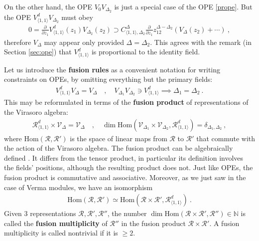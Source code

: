 \documentclass[12pt, a4paper]{article}
\newcommand{\myindex}[1]{\textbf{\boldmath #1}}
\theoremstyle{break}
\begin{document}
On the other hand, the OPE $V_0V_{\Delta_2}$ is just a special case of the OPE \eqref{prope}.
But the OPE $V^d_{\langle 1,1\rangle}V_{\Delta_2}$ must obey 
\begin{align}
 0 = \frac{\partial}{\partial z_1} V^d_{\langle 1,1\rangle}(z_1)V_{\Delta_2}(z_2) \supset C_{\langle 1,1\rangle,\Delta_2}^{\Delta} \frac{\partial}{\partial z_1} z_{12}^{\Delta-\Delta_2} \left(V_\Delta(z_2) +\cdots \right) \ ,
\end{align}
therefore $V_\Delta$ may appear only provided $\Delta=\Delta_2$. This agrees with the remark (in Section \ref{sec:ope}) that $V^d_{\langle 1,1\rangle}$ is proportional to the identity field. 

Let us introduce the \myindex{fusion rules} as a convenient notation for writing constraints on OPEs, by omitting everything but the primary fields:
\begin{align}
 V^d_{\langle 1,1\rangle} V_{\Delta} = V_\Delta \quad , \quad V_{\Delta_1} V_{\Delta_2} \ni V^d_{\langle 1,1\rangle} \implies \Delta_1=\Delta_2\ . 
\end{align}
This may be reformulated in terms of 
the \myindex{fusion product} of representations of the Virasoro algebra:
\begin{align}
 \mathcal{R}^d_{\langle 1,1\rangle} \times \mathcal{V}_\Delta = \mathcal{V}_\Delta \quad , \quad \dim\text{Hom}\left(\mathcal{V}_{\Delta_1}\times \mathcal{V}_{\Delta_2}, \mathcal{R}^d_{\langle 1,1\rangle}\right) = \delta_{\Delta_1,\Delta_2}\ ,
 \label{rtv}
\end{align}
where $\text{Hom}(\mathcal{R},\mathcal{R}')$ is the space of linear maps from $\mathcal{R}$ to $\mathcal{R}'$ that commute with the action of the Virasoro algebra. 
The fusion product can be algebraically defined \cite{gab99}. It differs from the tensor product, in particular its definition involves the fields' positions, although the resulting product does not. Just like OPEs, the fusion product is commutative and associative. Moreover, as we just saw in the case of Verma modules, we have an isomorphism
\begin{align}
 \text{Hom}\left(\mathcal{R},\mathcal{R}'\right) \simeq \text{Hom}\left(\mathcal{R}\times\mathcal{R}',\mathcal{R}^d_{\langle 1,1\rangle}\right)\ . 
 \label{hrr}
\end{align}
Given 3 representations $\mathcal{R},\mathcal{R}',\mathcal{R}''$, the number $\dim \text{Hom}\left(\mathcal{R}\times\mathcal{R}',\mathcal{R}''\right) \in \mathbb{N}$ is called the \myindex{fusion multiplicity} of $\mathcal{R}''$ in the fusion product $\mathcal{R}\times\mathcal{R}'$. A fusion multiplicity is called nontrivial if it is $\geq 2$. 
\end{document}
